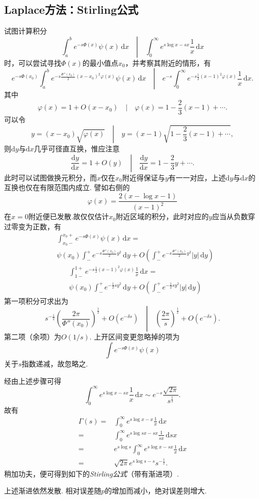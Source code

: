 \documentclass[UTF-8]{ctexart}
\newcommand{\dr}{\mathrm{d}}
\newcommand{\pare}[1]{\left(#1\right)}
\newcommand{\dy}{\dr y}
\newcommand{\dx}{\dr x}
\newcommand{\half}{\frac{1}{2}}
\newcommand{\intt}[2]{\int_0^\infty #1 \, \dr #2}
\newcommand{\intab}[4]{\int_{#1}^{#2} #3 \, \dr #4}
\newcommand{\dcol}[2]{\[ \left.#1 \hspace{1em}\right\vert\hspace{1em} #2 \]}
\newtheorem{reflection}{反射}
\newcommand{\refl}[1]{\vspace{0.5em}\par\noindent\fbox{%
    \parbox{\textwidth}{%
    \begin{reflection}
        #1
    \end{reflection}
    }%
}\vspace{0.5em}\par}
\begin{document}
  \subsection{Laplace方法：Stirling公式}
  试图计算积分
  \dcol{\intab{a}{b}{e^{-s\Phi\pare{x}}\psi\pare{x}}{x}}
  {\intt{e^{s\log x - sx}\frac{1}{x}}{x}}
  时，可以尝试寻找$\Phi\pare{x}$的最小值点$x_0$，并考察其附近的情形，有
  \dcol{e^{-s\Phi\pare{x_0}}\intab{a}{b}{e^{-s\frac{\Phi''\pare{x_0}}{2}\pare{x-x_0}^2\varphi\pare{x}}\psi\pare{x}}{x}}
  {e^{-s}\intt{e^{-s\half\pare{x-1}^2\varphi\pare{x}}\frac{1}{x}}{x}.}
  其中
  \dcol{\varphi\pare{x} = 1+O\pare{x-x_0}}
  {\varphi\pare{x} = 1-\frac{2}{3}\pare{x-1}+\cdots.}
  可以令
  \dcol{y=\pare{x-x_0}\sqrt{\varphi\pare{x}}}
  {y=\pare{x-1}\sqrt{1-\frac{2}{3}\pare{x-1}+\cdots},}
  则$\dy$与$\dx$几乎可径直互换，惟应注意
  \dcol{\frac{\dy}{\dx} = 1+O\pare{y}}
  {\frac{\dy}{\dx} = 1 - \frac{2}{3}y+\cdots.}
  此时可以试图做换元积分，而$x$仅在$x_0$附近得保证与$y$有一一对应，上述$\dy$与$\dx$的互换也仅在有限范围内成立. 譬如右侧的
  \[ \varphi\pare{x} = \frac{2\pare{x-\log x -1}}{\pare{x-1}^2} \]
  在$x=0$附近便已发散.故仅仅估计$x_0$附近区域的积分，此时对应的$y$应当从负数穿过零变为正数，有
  \begin{align*}
  &\intab{x_0-}{x_0 +}{e^{-s\Phi\pare{x}}\psi\pare{x}}{x} = \\ & \psi\pare{x_0}\intab{-}{+}{e^{-s\frac{\Phi''\pare{x_0}}{2}y^2}}{y} + O\pare{\intab{-}{+}{e^{-s\frac{\Phi''\pare{x_0}}{2}y^2}\left\vert y\right\vert}{y}}
  \end{align*}
  \hrulefill
  \begin{align*}
  &\intab{1-}{1+}{e^{-s\half\pare{x-1}^2\varphi\pare{x}}\frac{1}{x}}{x} = \\& \psi\pare{x_0}\intab{-}{+}{e^{-\half sy^2}}{y} + O\pare{\intab{-}{+}{e^{-\half sy^2}\left\vert y\right\vert}{y}}
  \end{align*}
  第一项积分可求出为
  \dcol{s^{-\half}\pare{\frac{2\pi}{\Phi''\pare{x_0}}}^{\half}+O\pare{e^{-\delta s}}}
  {\pare{\frac{2\pi}{s}}^{\half}+O\pare{e^{-\delta s}}.}
  第二项（余项）为$O\pare{1/s}$. 上开区间变更忽略掉的项为
  \[ \int e^{-s\Phi\pare{x}}\psi\pare{x} \]
  关于$s$指数递减，故忽略之.
  \par
  经由上述步骤可得
  \[ \intt{e^{s\log x - sx}\frac{1}{x}}{x} \sim e^{-s}\frac{\sqrt{2\pi}}{s^{\half}}. \]
  故有
  \begin{align*}
  \Gamma\pare{s} =& \intt{e^{s\log x - x}\frac{1}{x}}{x}\\ =& \intt{e^{s\log sx - sx}\frac{1}{sx}}{sx} \\=& e^{s\log s}\intt{e^{s\log x - sx}\frac{1}{x}}{x}\\
  =& \sqrt{2\pi} e^{s\log s-s}s^{-\half}.
  \end{align*}
  稍加功夫，便可得到如下的\emph{Stirling公式}（带有渐进项）.
  \refl{
    \label{refl:st}
    \[ p! = \Gamma\pare{p+1} = p^pe^{-p}\sqrt{2\pi p}\pare{1+\frac{1}{12p}+\frac{1}{288p^2}+\cdots}. \]
  }
  上述渐进依然发散. 相对误差随$p$的增加而减小，绝对误差则增大.
\end{document}
